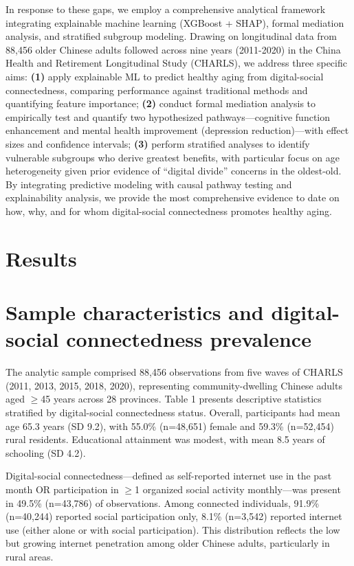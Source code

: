 \documentclass[10pt]{article}
\begin{document}
In response to these gaps, we employ a comprehensive analytical framework integrating explainable machine learning (XGBoost + SHAP), formal mediation analysis, and stratified subgroup modeling. Drawing on longitudinal data from 88,456 older Chinese adults followed across nine years (2011-2020) in the China Health and Retirement Longitudinal Study (CHARLS), we address three specific aims: \textbf{(1)} apply explainable ML to predict healthy aging from digital-social connectedness, comparing performance against traditional methods and quantifying feature importance; \textbf{(2)} conduct formal mediation analysis to empirically test and quantify two hypothesized pathways---cognitive function enhancement and mental health improvement (depression reduction)---with effect sizes and confidence intervals; \textbf{(3)} perform stratified analyses to identify vulnerable subgroups who derive greatest benefits, with particular focus on age heterogeneity given prior evidence of ``digital divide'' concerns in the oldest-old. By integrating predictive modeling with causal pathway testing and explainability analysis, we provide the most comprehensive evidence to date on how, why, and for whom digital-social connectedness promotes healthy aging.

\section*{Results}

\section*{Sample characteristics and digital-social connectedness prevalence}

The analytic sample comprised 88,456 observations from five waves of CHARLS (2011, 2013, 2015, 2018, 2020), representing community-dwelling Chinese adults aged $\geq$45 years across 28 provinces. Table 1 presents descriptive statistics stratified by digital-social connectedness status. Overall, participants had mean age 65.3 years (SD 9.2), with 55.0\% (n=48,651) female and 59.3\% (n=52,454) rural residents. Educational attainment was modest, with mean 8.5 years of schooling (SD 4.2).

Digital-social connectedness---defined as self-reported internet use in the past month OR participation in $\geq$1 organized social activity monthly---was present in 49.5\% (n=43,786) of observations. Among connected individuals, 91.9\% (n=40,244) reported social participation only, 8.1\% (n=3,542) reported internet use (either alone or with social participation). This distribution reflects the low but growing internet penetration among older Chinese adults, particularly in rural areas.
\end{document}
